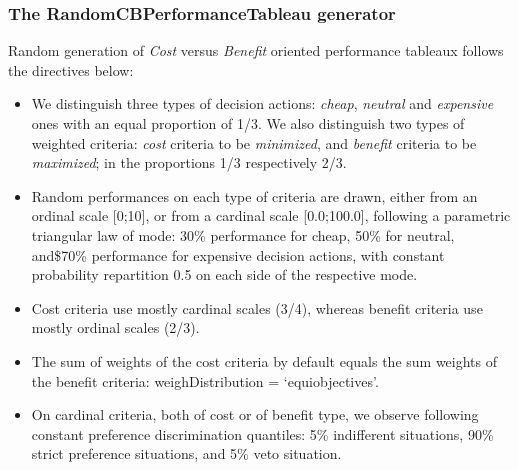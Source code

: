 \documentclass[letterpaper,10pt,english]{sphinxmanual}
\begin{document}
\subsubsection{The RandomCBPerformanceTableau generator}
\label{tutorial:the-randomcbperformancetableau-generator}
Random generation of \emph{Cost} versus \emph{Benefit} oriented performance tableaux follows the directives below:
\begin{itemize}
\item {} 
We distinguish three types of decision actions: \emph{cheap}, \emph{neutral} and \emph{expensive} ones with an equal proportion of 1/3. We also distinguish two types of weighted criteria: \emph{cost} criteria to be \emph{minimized}, and \emph{benefit} criteria to be \emph{maximized}; in the proportions 1/3 respectively 2/3.

\item {} 
Random performances on each type of criteria  are drawn, either from an ordinal scale {[}0;10{]}, or from a cardinal scale {[}0.0;100.0{]}, following a parametric triangular law of mode: 30\% performance for cheap, 50\% for neutral, and\$70\% performance for expensive decision actions, with constant probability repartition 0.5 on each side of the respective mode.

\item {} 
Cost criteria use mostly cardinal scales (3/4), whereas benefit criteria use mostly ordinal scales (2/3).

\item {} 
The sum of weights of the cost criteria by default equals the sum weights of the benefit criteria: weighDistribution = `equiobjectives'.

\item {} 
On cardinal criteria, both of cost or of benefit type, we observe following constant preference discrimination quantiles: 5\% indifferent situations, 90\% strict preference situations, and 5\% veto situation.

\end{itemize}
\end{document}
